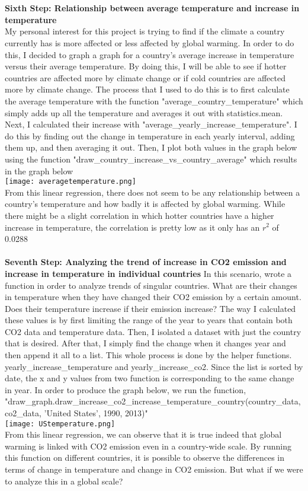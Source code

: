 \documentclass[fontsize=11pt]{article}
\begin{document}
\\\\
\textbf{Sixth Step: Relationship between average temperature and increase in temperature}
\\
My personal interest for this project is trying to find if the climate a country currently has is more affected or less affected by global warming. In order to do this, I decided to graph a graph for a country's average increase in temperature versus their average temperature. By doing this, I will be able to see if hotter countries are affected more by climate change or if cold countries are affected more by climate change. The process that I used to do this is to first calculate the average temperature with the function "average\_country\_temperature" which simply adds up all the temperature and averages it out with statistics.mean. Next, I calculated their increase with "average\_yearly\_increase\_temperature". I do this by finding out the change in temperature in each yearly interval, adding them up, and then averaging it out. Then, I plot both values in the graph below using the function "draw\_country\_increase\_vs\_country\_average" which results in the graph below
\\
\texttt{[image: averagetemperature.png]}
\\
From this linear regression, there does not seem to be any relationship between a country's temperature and how badly it is affected by global warming. While there might be a slight correlation in which hotter countries have a higher increase in temperature, the correlation is pretty low as it only has an $r^2$ of 0.0288
\\\\
\textbf{Seventh Step: Analyzing the trend of increase in CO2 emission and increase in temperature in individual countries}
In this scenario, wrote a function in order to analyze trends of singular countries. What are their changes in temperature when they have changed their CO2 emission by a certain amount. Does their temperature increase if their emission increase? The way I calculated these values is by first limiting the range of the year to years that contain both CO2 data and temperature data. Then, I isolated a dataset with just the country that is desired. After that, I simply find the change when it changes year and then append it all to a list. This whole process is done by the helper functions. yearly\_increase\_temperature and yearly\_increase\_co2. Since the list is sorted by date, the x and y values from two function is corresponding to the same change in year. In order to produce the graph below, we run the function, "draw\_graph.draw\_increase\_co2\_increase\_temperature\_country(country\_data, co2\_data, 'United States', 1990, 2013)" \\
\texttt{[image: UStemperature.png]}
\\
From this linear regression, we can observe that it is true indeed that global warming is linked with CO2 emission even in a country-wide scale. By running this function on different countries, it is possible to observe the differences in terms of change in temperature and change in CO2 emission. But what if we were to analyze this in a global scale?
\end{document}
